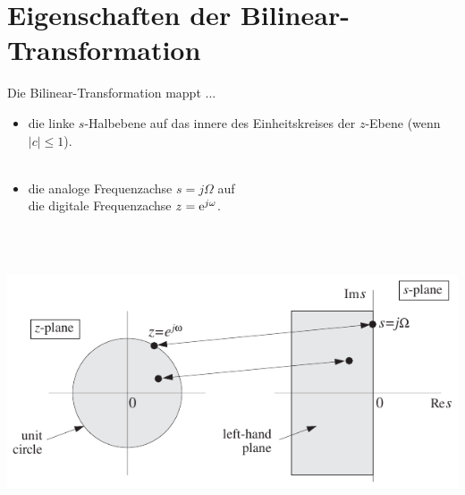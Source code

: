 \section{Eigenschaften der Bilinear-Transformation}
	Die Bilinear-Transformation mappt ...
	\begin{itemize}
		\item  die linke $s$-Halbebene auf das innere des Einheitskreises der $z$-Ebene (wenn $|c|\leq 1$).\\[0.15cm]
		\\[-0.4cm]
		\item die analoge Frequenzachse $s=j\Omega$ auf\\ die digitale Frequenzachse $z=\mathrm{e}^{j\omega}$.\\[0.2cm]
		\\[-2.5cm]
	\end{itemize}
	\begin{minipage}{0.45\textwidth}$ $\end{minipage}
	\begin{minipage}{0.5\textwidth}
		\includegraphics[width = \textwidth]{pic/bilinearTrans.pdf}
	\end{minipage}
	
